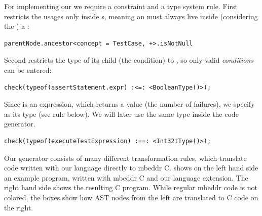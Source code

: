 
For implementing our  we require a constraint and a type
system rule. First restricts the usages only inside s, meaning an
 must always live inside (considering the ) a
:
\begin{lstlisting}[language=mbeddr,frame=single]
parentNode.ancestor<concept = TestCase, +>.isNotNull
\end{lstlisting}

Second restricts the type of its child  (the condition) to
, so only valid \emph{conditions} can be entered:
\begin{lstlisting}[language=mbeddr,frame=single]
check(typeof(assertStatement.expr) :<=: <BooleanType()>);
\end{lstlisting}

Since  is an expression, which returns a value (the
number of failures), we specify  as its type (see rule below). We
will later use the same type inside the code generator.
\begin{lstlisting}[language=mbeddr,frame=single]
check(typeof(executeTestExpression) :==: <Int32tType()>);
\end{lstlisting}



Our generator consists of many different transformation rules, which translate  
code written with our language directly to mbeddr C.  shows
on the left hand side an example program, written with mbeddr C and our language
extension. The right hand side shows the resulting C program. While
regular mbeddr code is not colored, the boxes show how \ac{AST} nodes from the
left are translated to C code on the right.


